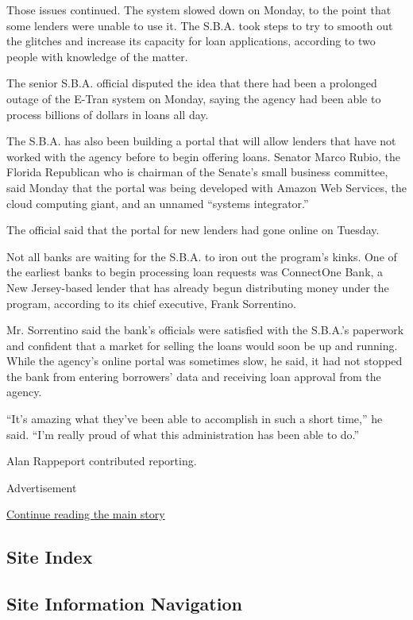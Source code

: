 Those issues continued. The system slowed down on Monday, to the point
that some lenders were unable to use it. The S.B.A. took steps to try to
smooth out the glitches and increase its capacity for loan applications,
according to two people with knowledge of the matter.

The senior S.B.A. official disputed the idea that there had been a
prolonged outage of the E-Tran system on Monday, saying the agency had
been able to process billions of dollars in loans all day.

The S.B.A. has also been building a portal that will allow lenders that
have not worked with the agency before to begin offering loans. Senator
Marco Rubio, the Florida Republican who is chairman of the Senate's
small business committee, said Monday that the portal was being
developed with Amazon Web Services, the cloud computing giant, and an
unnamed ``systems integrator.''

The official said that the portal for new lenders had gone online on
Tuesday.

Not all banks are waiting for the S.B.A. to iron out the program's
kinks. One of the earliest banks to begin processing loan requests was
ConnectOne Bank, a New Jersey-based lender that has already begun
distributing money under the program, according to its chief executive,
Frank Sorrentino.

Mr. Sorrentino said the bank's officials were satisfied with the
S.B.A.'s paperwork and confident that a market for selling the loans
would soon be up and running. While the agency's online portal was
sometimes slow, he said, it had not stopped the bank from entering
borrowers' data and receiving loan approval from the agency.

``It's amazing what they've been able to accomplish in such a short
time,'' he said. ``I'm really proud of what this administration has been
able to do.''

Alan Rappeport contributed reporting.

Advertisement

\protect\hyperlink{after-bottom}{Continue reading the main story}

\hypertarget{site-index}{%
\subsection{Site Index}\label{site-index}}

\hypertarget{site-information-navigation}{%
\subsection{Site Information
Navigation}\label{site-information-navigation}}

